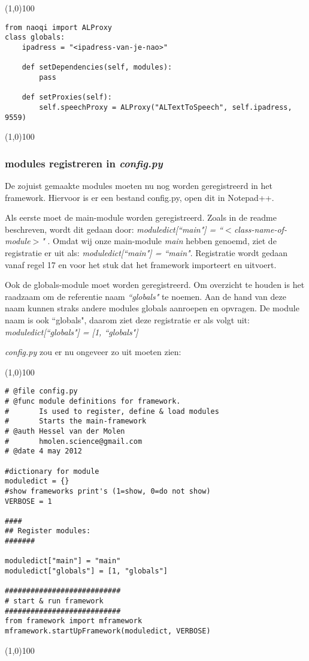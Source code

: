 \documentclass[a4paper]{article}
\begin{document}
\noindent \line(1,0){100}
\begin{verbatim}
from naoqi import ALProxy
class globals:
    ipadress = "<ipadress-van-je-nao>"

    def setDependencies(self, modules):
        pass

    def setProxies(self):
        self.speechProxy = ALProxy("ALTextToSpeech", self.ipadress, 9559)
\end{verbatim}
\noindent \line(1,0){100}

\subsubsection{modules registreren in \textit{config.py}}
De zojuist gemaakte modules moeten nu nog worden geregistreerd in het framework. Hiervoor is er een bestand config.py, open dit in Notepad++.

Als eerste moet de main-module worden geregistreerd. Zoals in de readme beschreven, wordt dit gedaan door:
 \textit{moduledict[``main"] = ``$<$class-name-of-module$>$" }. 
Omdat wij onze main-module \textit{main} hebben genoemd, ziet de registratie er uit als: \textit{moduledict[``main"] = ``main"}.
Registratie wordt gedaan vanaf regel 17 en voor het stuk dat het framework importeert en uitvoert.

Ook de globals-module moet worden geregistreerd. Om overzicht te houden is het raadzaam om de referentie naam \textit{``globals"} te noemen. Aan de hand van deze naam kunnen straks andere modules globals aanroepen en opvragen. De module naam is ook ``globals", daarom ziet deze registratie er als volgt uit: \textit{moduledict[``globals"] = [1, ``globals"]}

\newpage

\textit{config.py} zou er nu ongeveer zo uit moeten zien:

\noindent \line(1,0){100}
\begin{verbatim}
# @file config.py
# @func module definitions for framework. 
#       Is used to register, define & load modules 
#       Starts the main-framework
# @auth Hessel van der Molen
#       hmolen.science@gmail.com
# @date 4 may 2012

#dictionary for module
moduledict = {}
#show frameworks print's (1=show, 0=do not show)
VERBOSE = 1

####
## Register modules:
#######

moduledict["main"] = "main"
moduledict["globals"] = [1, "globals"]

###########################
# start & run framework
###########################
from framework import mframework
mframework.startUpFramework(moduledict, VERBOSE)
\end{verbatim}
\noindent \line(1,0){100}
\end{document}
